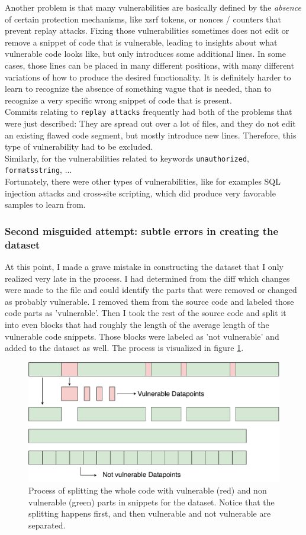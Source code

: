 \documentclass[
a4paper,
pagesize,
pdftex,
12pt,
twoside, %
BCOR=5mm, %
ngerman,
fleqn,
final,
]{scrartcl}
\begin{document}
	Another problem is that many vulnerabilities are basically defined by the \textit{absence} of certain protection mechanisms, like xsrf tokens, or nonces / counters that prevent replay attacks. Fixing those vulnerabilities sometimes does not edit or remove a snippet of code that is vulnerable, leading to insights about what vulnerable code looks like, but only introduces some additional lines. In some cases, those lines can be placed in many different positions, with many different variations of how to produce the desired functionality. It is definitely harder to learn to recognize the absence of something vague that is needed, than to recognize a very specific wrong snippet of code that is present.\\
	Commits relating to \texttt{replay attacks} frequently had both of the problems that were just described: They are spread out over a lot of files, and they do not edit an existing flawed code segment, but mostly introduce new lines. Therefore, this type of vulnerability had to be excluded.\\	
	Similarly, for the vulnerabilities related to keywords \texttt{unauthorized}, \texttt{formatsstring}, ...\\ %
	Fortunately, there were other types of vulnerabilities, like for examples SQL injection attacks and cross-site scripting, which did produce very favorable samples to learn from.
	
	\subsubsection{Second misguided attempt: subtle errors in creating the dataset}
	At this point, I made a grave mistake in constructing the dataset that I only realized very late in the process. I had determined from the diff which changes were made to the file and could identify the parts that were removed or changed as probably vulnerable. I removed them from the source code and labeled those code parts as 'vulnerable'. Then I took the rest of the source code and split it into even blocks that had roughly the length of the average length of the vulnerable code snippets. Those blocks were labeled as 'not vulnerable' and added to the dataset as well. The process is visualized in figure \ref{fig:collectData1}.
	
	\begin{figure}[ht]
		\centering
		\includegraphics[width=0.8\linewidth]{img/collectData1}
		\caption{Process of splitting the whole code with vulnerable (red) and non vulnerable (green) parts in snippets for the dataset. Notice that the splitting happens first, and then vulnerable and not vulnerable are separated.}
		\label{fig:collectData1}
	\end{figure}
	
\end{document}
